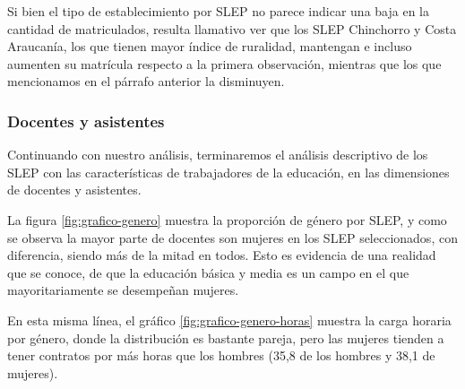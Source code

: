 \documentclass[
  12pt,
  letterpaper,
]{article}
\begin{document}
Si bien el tipo de establecimiento por SLEP no parece indicar una baja en la cantidad de matriculados, resulta llamativo ver que los SLEP Chinchorro y Costa Araucanía, los que tienen mayor índice de ruralidad, mantengan e incluso aumenten su matrícula respecto a la primera observación, mientras que los que mencionamos en el párrafo anterior la disminuyen.

\subsubsection{Docentes y asistentes}\label{docentes-y-asistentes}

Continuando con nuestro análisis, terminaremos el análisis descriptivo de los SLEP con las características de trabajadores de la educación, en las dimensiones de docentes y asistentes.

La figura \ref{fig:grafico-genero} muestra la proporción de género por SLEP, y como se observa la mayor parte de docentes son mujeres en los SLEP seleccionados, con diferencia, siendo más de la mitad en todos.
Esto es evidencia de una realidad que se conoce, de que la educación básica y media es un campo en el que mayoritariamente se desempeñan mujeres.

En esta misma línea, el gráfico \ref{fig:grafico-genero-horas} muestra la carga horaria por género, donde la distribución es bastante pareja, pero las mujeres tienden a tener contratos por más horas que los hombres (35,8 de los hombres y 38,1 de mujeres).
\end{document}
